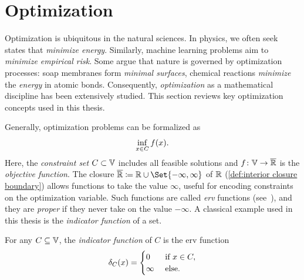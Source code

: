 \section{Optimization}
\label{sec:optimization}
Optimization is ubiquitous in the natural sciences.
In physics, we often seek states that \emph{minimize energy}.
Similarly, machine learning problems aim to \emph{minimize empirical risk}.
Some argue that nature is governed by optimization processes:
soap membranes form \emph{minimal surfaces}, chemical reactions \emph{minimize} the \emph{energy} in atomic bonds.
Consequently, \emph{optimization} as a mathematical discipline has been extensively studied.
This section reviews key optimization concepts used in this thesis.

Generally, optimization problems can be formalized as
\begin{equation}
	\inf_{x \in C} f(x).
	\label{eq:optimization problem}
\end{equation}
Here, the \emph{constraint set} \( C \subset \mathbb{V} \) includes all feasible solutions and \( f \colon \mathbb{V} \to \overline{\mathbb{R}} \) is the \emph{objective function}.
The closure \( \Closure{\R} \coloneqq \R \cup \Set{-\infty, \infty} \) of \( \mathbb{R} \) (\cref{def:interior closure boundary}) allows functions to take the value \( \infty \), useful for encoding constraints on the optimization variable.
Such functions are called \emph{\gls{erv}} functions (see~\cite[chapter 2]{beck_firstorder_2017}), and they are \emph{proper} if they never take on the value \( -\infty\).
A classical example used in this thesis is the \emph{indicator function} of a set.
\begin{definition}%
	\label{def:indicator function}
	For any \( C \subseteq \mathbb{V} \), the \emph{indicator function} of \( C \) is the \gls{erv} function
	\begin{equation}
		\delta_{C}(x) = \begin{cases}
			\num{0} &\ \text{if}\ x \in C, \\
			\infty &\ \text{else}.
		\end{cases}
	\end{equation}
\end{definition}

